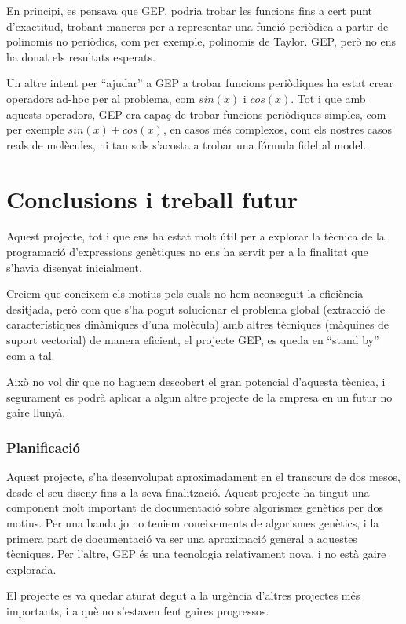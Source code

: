 En principi, es pensava que GEP, podria trobar les funcions fins a cert punt
d'exactitud, trobant maneres per a representar una funció periòdica a partir de
polinomis no periòdics, com per exemple, polinomis de Taylor. GEP, però no ens
ha donat els resultats esperats.

Un altre intent per ``ajudar'' a GEP a trobar funcions periòdiques ha estat
crear operadors ad-hoc per al problema, com $sin(x)$ i $cos(x)$.  Tot i que amb
aquests operadors, GEP era capaç de trobar funcions periòdiques simples, com per
exemple $sin(x)+cos(x)$, en casos més complexos, com els nostres casos reals de
molècules, ni tan sols s'acosta a trobar una fórmula fidel al model.

\section{Conclusions i treball futur} %
\label{sec:GConclusions i treball futur}
Aquest projecte, tot i que ens ha estat molt útil per a explorar la tècnica de
la programació d'expressions genètiques no ens ha servit per a la finalitat que
s'havia disenyat inicialment.

Creiem que coneixem els motius pels cuals no hem aconseguit la eficiència
desitjada, però com que s'ha pogut solucionar el problema global (extracció de
característiques dinàmiques d'una molècula) amb altres tècniques (màquines de
suport vectorial) de manera eficient, el projecte GEP, es queda en ``stand by''
com a tal.

Això no vol dir que no haguem descobert el gran potencial d'aquesta tècnica, i
segurament es podrà aplicar a algun altre projecte de la empresa en un futur no
gaire llunyà.

\subsubsection{Planificació} %
\label{ssub:GPlan}

Aquest projecte, s'ha desenvolupat aproximadament en el transcurs de dos mesos,
desde el seu diseny fins a la seva finalització.  Aquest projecte ha tingut una
component molt important de documentació sobre algorismes genètics per dos
motius.  Per una banda jo no teniem coneixements de algorismes genètics, i la
primera part de documentació va ser una aproximació general a aquestes
tècniques.  Per l'altre, GEP és una tecnologia relativament nova, i no està
gaire explorada. 

El projecte es va quedar aturat degut a la urgència d'altres projectes més
importants, i a què no s'estaven fent gaires progressos.

